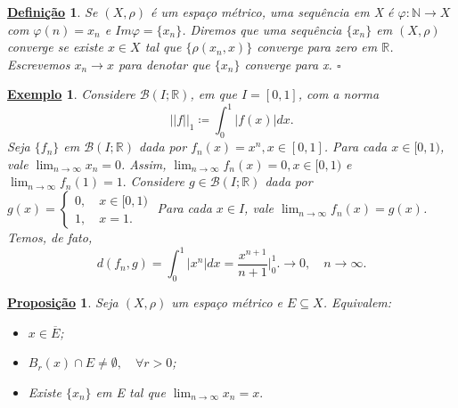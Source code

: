 \documentclass{article}
\newtheorem*{def*}{\underline{Defini\c c\~ao}}
\newtheorem*{prop*}{\underline{Proposi\c c\~ao}}
\newtheorem{example}{\underline{Exemplo}}
\begin{document}
\begin{def*}
  Se \((X, \rho )\) é um espaço métrico, uma sequência em X é \(\varphi:\mathbb{N}\rightarrow X\) com \(\varphi(n) = x_{n}\) e
\(Im\varphi = \{x_{n}\}\). Diremos que uma sequência \(\{x_{n}\}\) em \((X, \rho )\) converge se existe \(x\in X\)
tal que \(\{\rho(x_{n}, x)\}\) converge para zero em \(\mathbb{R}\). Escrevemos \(x_{n}\rightarrow x\) para denotar que \(\{x_{n}\}\) 
converge para x. \(\square\)
\end{def*}
\begin{example}
  Considere \(\mathcal{B}(I; \mathbb{R})\), em que \(I = [0, 1]\), com a norma 
    \[
      ||f||_{1}\coloneqq \int_{0}^{1}|f(x)|dx.
    \]
    Seja \(\{f_{n}\}\) em \(\mathcal{B}(I; \mathbb{R})\) dada por \(f_{n}(x) =x^{n}, x\in[0,1]\). Para cada \(x\in[0, 1)\), vale
 \(\lim_{n\to \infty}x_{n} = 0\). Assim, \(\lim_{n\to \infty}f_{n}(x) = 0, x\in[0, 1)\) e \(\lim_{n\to \infty}f_{n}(1) = 1.\) Considere \(g\in \mathcal{B}(I; \mathbb{R})\)
 dada por \(g(x) = \left\{\begin{array}{ll}
     0,\quad x\in[0, 1)\\
     1,\quad x=1.
   \end{array}\right.\)
  Para cada \(x\in I\), vale \(\lim_{n\to \infty}f_{n}(x)=g(x)\). Temos, de fato, 
    \[
      d(f_{n}, g)= \int_{0}^{1}|x^{n}|dx = \frac{x^{n+1}}{n+1}\biggl|_{0}^{1}\biggr.\longrightarrow 0,\quad n\to\infty.
    \] 
\end{example}
\begin{prop*}
  Seja \((X, \rho )\) um espaço métrico e \(E\subseteq{X}\). Equivalem: 
 \begin{itemize}
   \item[a)] \(x\in \overline{E}\);
   \item[b)] \(B_{r}(x)\cap E \neq\emptyset,\quad \forall r>0\);
   \item[c)] Existe \(\{x_{n}\}\) em E tal que \(\lim_{n\to \infty}x_{n} = x.\)
 \end{itemize}
\end{prop*}
\end{document}
